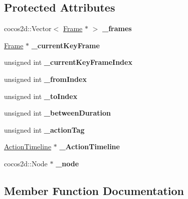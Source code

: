 \subsection*{Protected Attributes}
\begin{DoxyCompactItemize}
\item 
\mbox{\label{classTimeline_ac560cbbfad584a98256395acd4d8f44b}} 
cocos2d\+::\+Vector$<$ \hyperlink{classFrame}{Frame} $\ast$ $>$ {\bfseries \+\_\+frames}
\item 
\mbox{\label{classTimeline_abf40833f88f70686b7c933de0ffbac57}} 
\hyperlink{classFrame}{Frame} $\ast$ {\bfseries \+\_\+current\+Key\+Frame}
\item 
\mbox{\label{classTimeline_adf4c87e88e0af24e762936673d6a305b}} 
unsigned int {\bfseries \+\_\+current\+Key\+Frame\+Index}
\item 
\mbox{\label{classTimeline_aaa8922eb2730d3a6e946346fe6651243}} 
unsigned int {\bfseries \+\_\+from\+Index}
\item 
\mbox{\label{classTimeline_af4ef915b0d89ce7ea267b3bb8bf4d8ee}} 
unsigned int {\bfseries \+\_\+to\+Index}
\item 
\mbox{\label{classTimeline_a164ac8c1fe62638dd9dd8c776137ba6d}} 
unsigned int {\bfseries \+\_\+between\+Duration}
\item 
\mbox{\label{classTimeline_af408bcc9a0710398d9d0abb9cb6c1432}} 
unsigned int {\bfseries \+\_\+action\+Tag}
\item 
\mbox{\label{classTimeline_a2c45bdfd7d273ec9d1f543b20b9375e6}} 
\hyperlink{classActionTimeline}{Action\+Timeline} $\ast$ {\bfseries \+\_\+\+Action\+Timeline}
\item 
\mbox{\label{classTimeline_aa25ad526cdfe18c1020f8d2b51ebb865}} 
cocos2d\+::\+Node $\ast$ {\bfseries \+\_\+node}
\end{DoxyCompactItemize}


\subsection{Member Function Documentation}
\mbox{\label{classTimeline_a82ef4c0ac02b4a066c688c38ed1ac7eb}} 
